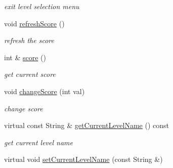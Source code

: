 \begin{DoxyCompactItemize}
\begin{DoxyCompactList}\small\item\em exit level selection menu \end{DoxyCompactList}\item 
void \hyperlink{class_basic_tutorial__00_a5e0cbb9bab080bed9aa7d1919bea36dc}{refresh\+Score} ()\hypertarget{class_basic_tutorial__00_a5e0cbb9bab080bed9aa7d1919bea36dc}{}\label{class_basic_tutorial__00_a5e0cbb9bab080bed9aa7d1919bea36dc}

\begin{DoxyCompactList}\small\item\em refresh the score \end{DoxyCompactList}\item 
int \& \hyperlink{class_basic_tutorial__00_a376cbc51afc862822eb4d6a4c3371cb1}{score} ()\hypertarget{class_basic_tutorial__00_a376cbc51afc862822eb4d6a4c3371cb1}{}\label{class_basic_tutorial__00_a376cbc51afc862822eb4d6a4c3371cb1}

\begin{DoxyCompactList}\small\item\em get current score \end{DoxyCompactList}\item 
void \hyperlink{class_basic_tutorial__00_a478be738fa4414c86c4bb5b1955853ea}{change\+Score} (int val)\hypertarget{class_basic_tutorial__00_a478be738fa4414c86c4bb5b1955853ea}{}\label{class_basic_tutorial__00_a478be738fa4414c86c4bb5b1955853ea}

\begin{DoxyCompactList}\small\item\em change score \end{DoxyCompactList}\item 
virtual const String \& \hyperlink{class_basic_tutorial__00_aa230d468c40ca1efe0cb8832c6308609}{get\+Current\+Level\+Name} () const \hypertarget{class_basic_tutorial__00_aa230d468c40ca1efe0cb8832c6308609}{}\label{class_basic_tutorial__00_aa230d468c40ca1efe0cb8832c6308609}

\begin{DoxyCompactList}\small\item\em get current level name \end{DoxyCompactList}\item 
virtual void \hyperlink{class_basic_tutorial__00_a20579e2759d963371d6598bbacf8a631}{set\+Current\+Level\+Name} (const String \&)\hypertarget{class_basic_tutorial__00_a20579e2759d963371d6598bbacf8a631}{}\label{class_basic_tutorial__00_a20579e2759d963371d6598bbacf8a631}


\end{DoxyCompactItemize}
